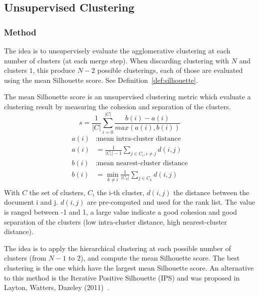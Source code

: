 \subsection{Unsupervised Clustering \label{sec:unsupervised_clustering}}

\subsubsection{Method}

The idea is to unsupervisely evaluate the agglomerative clustering at each number of clusters (at each merge step).
When discarding clustering with $N$ and clusters $1$, this produce $N - 2$ possible clusterings, each of those are evaluated using the mean Silhouette score.
See Definition~\ref{def:silhouette}.

\begin{definition}
  \label{def:silhouette}
  The mean Silhouette score is an unsupervised clustering metric which evaluate a clustering result by measuring the cohesion and separation of the clusters.
  \begin{equation}
    s = \frac{1}{|C|} \sum_{i = 0}^{|C|} \frac{b(i) - a(i)}{max(a(i), b(i))}
  \end{equation}
  \begin{equation}
    \begin{split}
      a(i)&: \text{mean intra-cluster distance} \\
      a(i)& = \frac{1}{|C_i| - 1} \sum_{j \in C_i, i\neq j} d(i, j) \\
      b(i)&: \text{mean nearest-cluster distance} \\
      b(i)& = \min_{k\neq i} \frac{1}{|C_k|} \sum_{j \in C_k} d(i, j) \\
    \end{split}
  \end{equation}
  With $C$ the set of clusters, $C_i$ the i-th cluster, $d(i, j)$ the distance between the document i and j.
  $d(i, j)$ are pre-computed and used for the rank list.
  The value is ranged between -1 and 1, a large value indicate a good cohesion and good separation of the clusters (low intra-cluster distance, high nearest-cluster distance).
\end{definition}

The idea is to apply the hierarchical clustering at each possible number of clusters (from $N - 1$ to $2$), and compute the mean Silhouette score.
The best clustering is the one which have the largest mean Silhouette score.
An alternative to this method is the Iterative Positive Silhouette (IPS) and was proposed in Layton, Watters, Dazeley (2011)~\cite{automated_unsupervised}.

